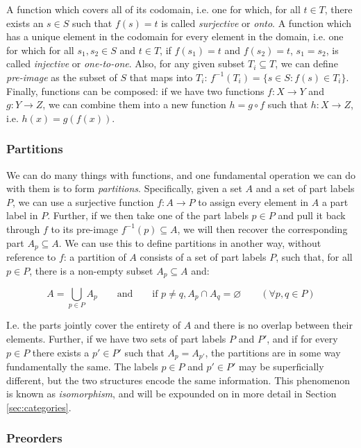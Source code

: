 \documentclass[12pt,a4paper]{article}
\begin{document}
A function which covers all of its codomain, i.e. one for which, for all $t \in T$, there exists an $s \in S$ such that $f(s) = t$ is called \textit{surjective} or \textit{onto}. A function which has a unique element in the codomain for every element in the domain, i.e. one for which for all $s_1, s_2 \in S$ and $t \in T$, if $f(s_1) = t$ and $f(s_2) = t$, $s_1 = s_2$, is called \textit{injective} or \textit{one-to-one}. Also, for any given subset $T_i \subseteq T$, we can define \textit{pre-image} as the subset of $S$ that maps into $T_i$: $f^{-1}(T_i) = \{ s \in S : f(s) \in T_i \}$. Finally, functions can be composed: if we have two functions $f: X \to Y$ and $g: Y \to Z$, we can combine them into a new function $h = g \circ f$ such that $h: X \to Z$, i.e. $h(x) = g(f(x))$. 

\subsubsection{Partitions}

We can do many things with functions, and one fundamental operation we can do with them is to form \textit{partitions}. Specifically, given a set $A$ and a set of part labels $P$, we can use a surjective function $f: A \to P$ to assign every element in $A$ a part label in $P$. Further, if we then take one of the part labels $p \in P$ and pull it back through $f$ to its pre-image $f^{-1}(p) \subseteq A$, we will then recover the corresponding part $A_p \subseteq A$. We can use this to define partitions in another way, without reference to $f$: a partition of $A$ consists of a set of part labels $P$, such that, for all $p \in P$, there is a non-empty subset $A_p \subseteq A$ and:

$$A = \bigcup_{p \in P} A_p \qquad \text{and} \qquad \text{if } p \neq q, A_p \cap A_q = \varnothing \qquad (\forall p, q \in P)$$

I.e. the parts jointly cover the entirety of $A$ and there is no overlap between their elements. Further, if we have two sets of part labels $P$ and $P'$, and if for every $p \in P$ there exists a $p' \in P'$ such that $A_p = A_{p'}$, the partitions are in some way fundamentally the same. The labels $p \in P$ and $p' \in P'$ may be superficially different, but the two structures encode the same information. This phenomenon is known as \textit{isomorphism}, and will be expounded on in more detail in Section \ref{sec:categories}.  

\subsubsection{Preorders}
\end{document}
